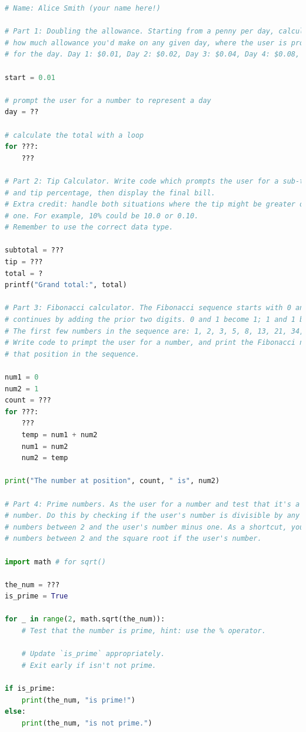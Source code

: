 \documentclass[letter,10pt]{article}
\begin{document}
    \begin{lstlisting}[language=python]
# Name: Alice Smith (your name here!)

# Part 1: Doubling the allowance. Starting from a penny per day, calculate
# how much allowance you'd make on any given day, where the user is prompted
# for the day. Day 1: $0.01, Day 2: $0.02, Day 3: $0.04, Day 4: $0.08, etc.

start = 0.01

# prompt the user for a number to represent a day
day = ??

# calculate the total with a loop
for ???:
    ???

# Part 2: Tip Calculator. Write code which prompts the user for a sub-total
# and tip percentage, then display the final bill.
# Extra credit: handle both situations where the tip might be greater or less than
# one. For example, 10% could be 10.0 or 0.10.
# Remember to use the correct data type.

subtotal = ???
tip = ???
total = ?
printf("Grand total:", total)

# Part 3: Fibonacci calculator. The Fibonacci sequence starts with 0 and 1, and
# continues by adding the prior two digits. 0 and 1 become 1; 1 and 1 become 2; etc.
# The first few numbers in the sequence are: 1, 2, 3, 5, 8, 13, 21, 34, 55, 89.
# Write code to primpt the user for a number, and print the Fibonacci number at
# that position in the sequence.

num1 = 0
num2 = 1
count = ???
for ???:
    ???
    temp = num1 + num2
    num1 = num2
    num2 = temp

print("The number at position", count, " is", num2)

# Part 4: Prime numbers. As the user for a number and test that it's a prime
# number. Do this by checking if the user's number is divisible by any of the
# numbers between 2 and the user's number minus one. As a shortcut, you may check
# numbers between 2 and the square root if the user's number.

import math # for sqrt()

the_num = ???
is_prime = True

for _ in range(2, math.sqrt(the_num)):
    # Test that the number is prime, hint: use the % operator.
    
    # Update `is_prime` appropriately.
    # Exit early if isn't not prime.

if is_prime:
    print(the_num, "is prime!")
else:
    print(the_num, "is not prime.")
        
    \end{lstlisting}
    
\end{document}
